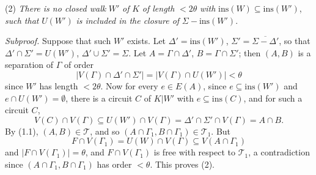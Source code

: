 \hspace*{12pt}(2) \textit{There is no closed walk} $W'$ \textit{of} $K$ \textit{of length} $< 2\theta$ \textit{with} $\text{ins}(W) \subseteq \text{ins}(W')$, \textit{such that} $U(W')$ \textit{is included in the closure of} $\Sigma - \text{ins}(W')$.

\textit{Subproof.} Suppose that such $W'$ exists. Let $\Delta' = \text{ins}(W')$, $\Sigma' = \overline{\Sigma - \Delta'}$, so that $\Delta' \cap \Sigma' = U(W')$, $\Delta' \cup \Sigma' = \Sigma$. Let $A = \Gamma \cap \Delta'$, $B = \Gamma \cap \Sigma'$; then $(A, B)$ is a separation of $\Gamma$ of order
\begin{equation*}
|V(\Gamma) \cap \Delta' \cap \Sigma'| = |V(\Gamma) \cap U(W')| < \theta
\end{equation*}
since $W'$ has length $< 2\theta$. Now for every $e \in E(A)$, since $e \subseteq \text{ins}(W')$ and $e \cap U(W') = \emptyset$, there is a circuit $C$ of $K | W'$ with $e \subseteq \text{ins}(C)$, and for such a circuit $C$,
\begin{equation*}
V(C) \cap V(\Gamma) \subseteq U(W') \cap V(\Gamma) = \Delta' \cap \Sigma' \cap V(\Gamma) = A \cap B.
\end{equation*}
By (1.1), $(A, B) \in \mathscr{T}$, and so $(A \cap \Gamma_1, B \cap \Gamma_1) \in \mathscr{T}_1$. But
\begin{equation*}
F \cap V(\Gamma_1) = U(W) \cap V(\Gamma) \subseteq V(A \cap \Gamma_1)
\end{equation*}
and $|F \cap V(\Gamma_1)| = \theta$, and $F \cap V(\Gamma_1)$ is free with respect to $\mathscr{T}_1$, a contradiction since $(A \cap \Gamma_1, B \cap \Gamma_1)$ has order $< \theta$. This proves (2).


